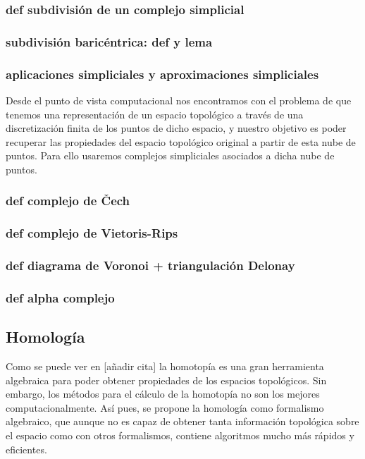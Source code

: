 \subsubsection*{def subdivisión de un complejo simplicial}
\subsubsection*{subdivisión baricéntrica: def y lema}
\subsubsection*{aplicaciones simpliciales y aproximaciones simpliciales}

Desde el punto de vista computacional nos encontramos con el problema de que tenemos una representación de un espacio topológico a través de una discretización finita de los puntos de dicho espacio, y nuestro objetivo es poder recuperar las propiedades del espacio topológico original a partir de esta nube de puntos. Para ello usaremos complejos simpliciales asociados a dicha nube de puntos.

\subsubsection*{def complejo de \v{C}ech}
\subsubsection*{def complejo de Vietoris-Rips}
\subsubsection*{def diagrama de Voronoi + triangulación Delonay}
\subsubsection*{def alpha complejo}

\subsection{Homología}
Como se puede ver en [añadir cita] la homotopía es una gran herramienta algebraica para poder obtener propiedades de los espacios topológicos. Sin embargo, los métodos para el cálculo de la homotopía no son los mejores computacionalmente. Así pues, se propone la homología como formalismo algebraico, que aunque no es capaz de obtener tanta información topológica sobre el espacio como con otros formalismos, contiene algoritmos mucho más rápidos y eficientes.


